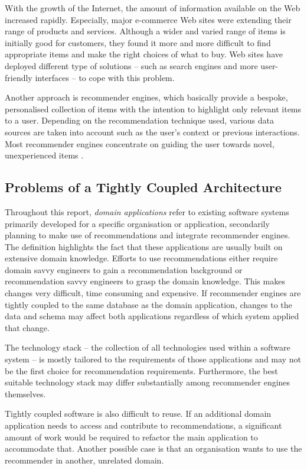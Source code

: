 With the growth of the Internet, the amount of information available on the Web increased rapidly. Especially, major e-commerce Web sites were extending their range of products and services. Although a wider and varied range of items is initially good for customers, they found it more and more difficult to find appropriate items and make the right choices of what to buy. Web sites have deployed different type of solutions -- such as search engines and more user-friendly interfaces -- to cope with this problem.

Another approach is recommender engines, which basically provide a bespoke, personalised collection of items with the intention to highlight only relevant items to a user. Depending on the recommendation technique used, various data sources are taken into account such as the user's context or previous interactions. Most recommender engines concentrate on guiding the user towards novel, unexperienced items \cite{herlocker04}.

\subsection{Problems of a Tightly Coupled Architecture}
\label{intro-bg-problems}

Throughout this report, \emph{domain applications} refer to existing software systems primarily developed for a specific organisation or application, secondarily planning to make use of recommendations and integrate recommender engines. The definition highlights the fact that these applications are usually built on extensive domain knowledge. Efforts to use recommendations either require domain savvy engineers to gain a recommendation background or recommendation savvy engineers to grasp the domain knowledge. This makes changes very difficult, time consuming and expensive. If recommender engines are tightly coupled to the same database as the domain application, changes to the data and schema may affect both applications regardless of which system applied that change.

The technology stack -- the collection of all technologies used within a software system -- is mostly tailored to the requirements of those applications and may not be the first choice for recommendation requirements. Furthermore, the best suitable technology stack may differ substantially among recommender engines themselves.

Tightly coupled software is also difficult to reuse. If an additional domain application needs to access and contribute to recommendations, a significant amount of work would be required to refactor the main application to accommodate that. Another possible case is that an organisation wants to use the recommender in another, unrelated domain.

